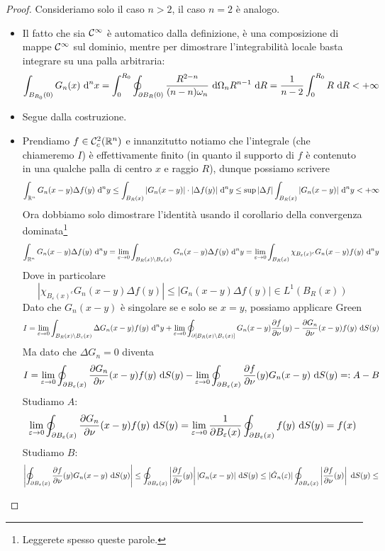 \documentclass{article}
\begin{document}
\begin{proof}
    Consideriamo solo il caso $n>2$, il caso $n=2$ è analogo.\begin{itemize}
        \item Il fatto che sia $\mathcal{C}^\infty$ è automatico dalla definizione, è una composizione di mappe $\mathcal{C}^\infty$ sul dominio, mentre per dimostrare l'integrabilità locale basta integrare su una palla arbitraria:
        \[\int_{B_{R_0}(0)} G_n(x)\text{ d}^n x = \int_0^{R_0} \oint_{\partial B_R(0)}\frac{R^{2-n}}{(n-n)\omega_n}\text{ d}\Omega_n R^{n-1}\text{ d} R = \frac{1}{n-2}\int_0^{R_0} R\text{ d} R < +\infty\]
        \item Segue dalla costruzione.
        \item Prendiamo $f\in\mathcal{C}^2_c(\mathbb{R}^n)$ e innanzitutto notiamo che l'integrale (che chiameremo $I$) è effettivamente finito (in quanto il supporto di $f$ è contenuto in una qualche palla di centro $x$ e raggio $R$), dunque possiamo scrivere
        \[ \int_{\mathbb{R}^n} G_n(x-y)\Delta f(y) \text{ d}^n y \le \int_{B_R(x)}|G_n(x-y)|\cdot |\Delta f(y)|\text{ d}^n y \le \sup|\Delta f|\int_{B_R(x)} |G_n(x-y)|\text{ d}^n y < +\infty  \]
        Ora dobbiamo solo dimostrare l'identità usando il corollario della convergenza dominata\footnote{Leggerete spesso queste parole.}
        \[\int_{\mathbb{R}^n} G_n(x-y)\Delta f(y) \text{ d}^n y = \lim_{\varepsilon \to 0} \int_{B_R(x)\setminus B_\varepsilon(x)}G_n(x-y)\Delta f(y) \text{ d}^n y = \lim_{\varepsilon\to 0} \int_{B_R(x)} \chi_{B_\varepsilon(x)^c}G_n(x-y)f(y)\text{ d}^n y\]
        Dove in particolare
        \[|\chi_{B_\varepsilon(x)^c}G_n(x-y)\Delta f(y)|\le|G_n(x-y)\Delta f(y)| \in L^1(B_R(x))\]
        Dato che $G_n(x-y)$ è singolare se e solo se $x=y$, possiamo applicare Green
        \[I = \lim_{\varepsilon \to 0} \int_{B_R(x)\setminus B_\varepsilon(x)}\Delta G_n(x-y) f(y) \text{ d}^n y + \lim_{\varepsilon\to 0} \oint_{\partial [B_R(x)\setminus B_\varepsilon(x)]} G_n(x-y)\frac{\partial f}{\partial \nu}(y) - \frac{\partial G_n}{\partial \nu}(x-y) f(y)\text{ d} S(y)\]
        Ma dato che $\Delta G_n= 0$ diventa
        \[I=\lim_{\varepsilon\to 0}\oint_{\partial B_\varepsilon(x)}\frac{\partial G_n}{\partial \nu}(x-y)f(y)\text{ d} S(y) - \lim_{\varepsilon\to 0}\oint_{\partial B_\varepsilon(x)}\frac{\partial f}{\partial \nu}(y)G_n(x-y)\text{ d} S(y) =: A-B\]
        Studiamo $A$:
        \[\lim_{\varepsilon\to 0}\oint_{\partial B_\varepsilon(x)}\frac{\partial G_n}{\partial \nu}(x-y)f(y)\text{ d} S(y) = \lim_{\varepsilon\to 0} \frac{1}{\partial B_\varepsilon(x)}\oint_{\partial B_\varepsilon(x)}f(y)\text{ d} S(y) = f(x)\]
        Studiamo $B$:
        \[\left|\oint_{\partial B_\varepsilon(x)}\frac{\partial f}{\partial \nu}(y)G_n(x-y)\text{ d} S(y)\right|\le \oint_{\partial B_\varepsilon(x)}\left|\frac{\partial f}{\partial \nu}(y)\right||G_n(x-y)|\text{ d} S(y)\le |\tilde{G}_n(\varepsilon)|\oint_{\partial B_\varepsilon(x)}\left|\frac{\partial f}{\partial \nu}(y)\right|\text{ d} S(y)\le\]

\end{itemize}
\end{proof}
\end{document}
